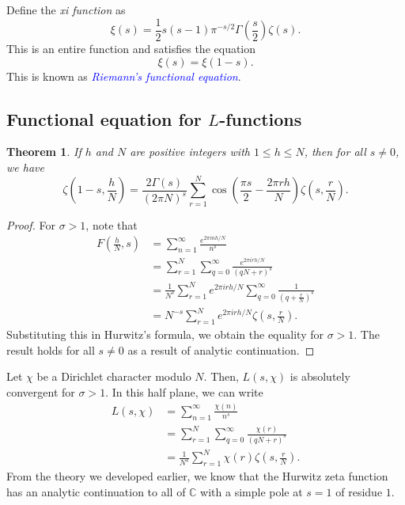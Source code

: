 \documentclass[12pt]{article}
\theoremstyle{thmstyle}
\newtheorem{theorem}{Theorem}[section]
\theoremstyle{defstyle}
\newcommand{\bbC}{\mathbb{C}}
\newcommand{\define}[1]{\textcolor{blue}{\textit{#1}}}
\renewcommand{\le}{\leqslant}
\begin{document}
Define the \emph{xi function} as 
\begin{equation*}
    \xi(s) = \frac{1}{2}s(s - 1)\pi^{-s/2}\Gamma\left(\frac{s}{2}\right)\zeta(s).
\end{equation*}
This is an entire function and satisfies the equation 
\begin{equation*}
    \xi(s) = \xi(1 - s).
\end{equation*}
This is known as \define{Riemann's functional equation}.


\subsection{Functional equation for \texorpdfstring{$L$}{L}-functions}

\begin{theorem}
    If $h$ and $N$ are positive integers with $1\le h\le N$, then for all $s\ne 0$, we have 
    \begin{equation*}
        \zeta\left(1 - s, \frac{h}{N}\right) = \frac{2\Gamma(s)}{(2\pi N)^s}\sum_{r = 1}^N \cos\left(\frac{\pi s}{2} - \frac{2\pi rh}{N}\right)\zeta\left(s, \frac{r}{N}\right).
    \end{equation*}
\end{theorem}
\begin{proof}
    For $\sigma > 1$, note that 
    \begin{align*}
        F\left(\frac{h}{N}, s\right) &= \sum_{n = 1}^\infty\frac{e^{2\pi i nh/N}}{n^s}\\
        &= \sum_{r = 1}^N \sum_{q = 0}^\infty\frac{e^{2\pi i rh/N}}{(qN + r)^s}\\
        &= \frac{1}{N^s}\sum_{r = 1}^N e^{2\pi irh/N}\sum_{q = 0}^\infty\frac{1}{\left(q + \frac{r}{N}\right)^s}\\
        &= N^{-s}\sum_{r = 1}^N e^{2\pi i rh/N}\zeta\left(s, \frac{r}{N}\right).
    \end{align*}
    Substituting this in Hurwitz's formula, we obtain the equality for $\sigma > 1$. The result holds for all $s\ne 0$ as a result of analytic continuation.
\end{proof}

Let $\chi$ be a Dirichlet character modulo $N$. Then, $L(s,\chi)$ is absolutely convergent for $\sigma > 1$. In this half plane, we can write 
\begin{align*}
    L(s,\chi) &= \sum_{n = 1}^\infty\frac{\chi(n)}{n^s}\\
    &= \sum_{r = 1}^N\sum_{q = 0}^\infty\frac{\chi(r)}{(qN + r)^s}\\
    &= \frac{1}{N^s}\sum_{r = 1}^N\chi(r)\zeta\left(s, \frac{r}{N}\right).
\end{align*}
From the theory we developed earlier, we know that the Hurwitz zeta function has an analytic continuation to all of $\bbC$ with a simple pole at $s = 1$ of residue $1$. 
\end{document}

